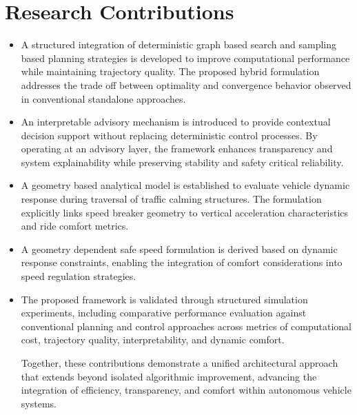 \documentclass[a4paper,12pt,one side]{report}
\theoremstyle{definition}
\begin{document}
\section{Research Contributions}
\begin{itemize}


\item A structured integration of deterministic graph based search and sampling based planning strategies is developed to improve computational performance while maintaining trajectory quality. The proposed hybrid formulation addresses the trade off between optimality and convergence behavior observed in conventional standalone approaches.
\item An interpretable advisory mechanism is introduced to provide contextual decision support without replacing deterministic control processes. By operating at an advisory layer, the framework enhances transparency and system explainability while preserving stability and safety critical reliability.
\item A geometry based analytical model is established to evaluate vehicle dynamic response during traversal of traffic calming structures. The formulation explicitly links speed breaker geometry to vertical acceleration characteristics and ride comfort metrics.
\item A geometry dependent safe speed formulation is derived based on dynamic response constraints, enabling the integration of comfort considerations into speed regulation strategies.
\item The proposed framework is validated through structured simulation experiments, including comparative performance evaluation against conventional planning and control approaches across metrics of computational cost, trajectory quality, interpretability, and dynamic comfort.

Together, these contributions demonstrate a unified architectural approach that extends beyond isolated algorithmic improvement, advancing the integration of efficiency, transparency, and comfort within autonomous vehicle systems.

\end{itemize}
\end{document}
